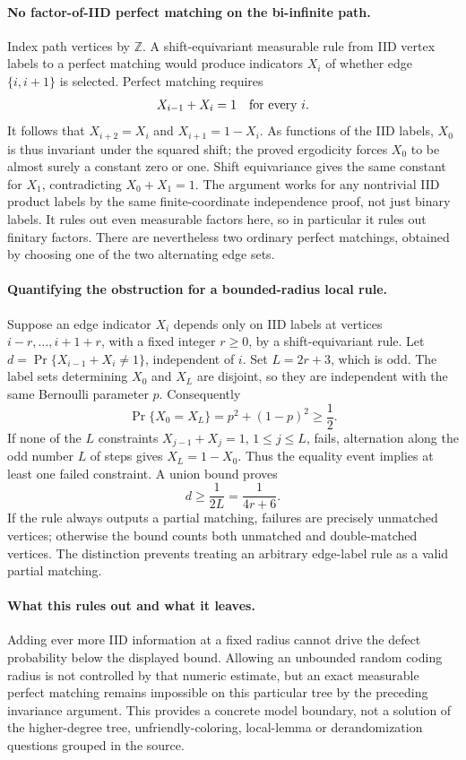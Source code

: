 \documentclass[11pt]{article}
\begin{document}
\paragraph{No factor-of-IID perfect matching on the bi-infinite path.}
Index path vertices by $\mathbb Z$. A shift-equivariant measurable rule from
IID vertex labels to a perfect matching would produce indicators $X_i$ of
whether edge $\{i,i+1\}$ is selected. Perfect matching requires
\[
 X_{i-1}+X_i=1\quad\hbox{for every }i.
\]
It follows that $X_{i+2}=X_i$ and $X_{i+1}=1-X_i$.
As functions of the IID labels, $X_0$ is thus invariant under the squared
shift; the proved ergodicity forces $X_0$ to be almost surely a constant zero
or one. Shift equivariance gives the same constant for $X_1$, contradicting
$X_0+X_1=1$. The argument works for any nontrivial IID product labels by the
same finite-coordinate independence proof, not just binary labels.
It rules out even measurable factors here, so in particular it rules out
finitary factors. There are nevertheless two ordinary perfect matchings,
obtained by choosing one of the two alternating edge sets.

\paragraph{Quantifying the obstruction for a bounded-radius local rule.}
Suppose an edge indicator $X_i$ depends only on IID labels at vertices
$i-r,\ldots,i+1+r$, with a fixed integer $r\geq0$, by a shift-equivariant
rule. Let
$d=\Pr\{X_{i-1}+X_i\ne1\}$, independent of $i$.
Set $L=2r+3$, which is odd. The label sets determining $X_0$ and $X_L$
are disjoint, so they are independent with the same Bernoulli parameter $p$.
Consequently
\[
 \Pr\{X_0=X_L\}=p^2+(1-p)^2\geq\frac12.
\]
If none of the $L$ constraints $X_{j-1}+X_j=1$, $1\leq j\leq L$,
fails, alternation along the odd number $L$ of steps gives $X_L=1-X_0$.
Thus the equality event implies at least one failed constraint. A union bound
proves
\[
 d\geq\frac1{2L}=\frac1{4r+6}.
\]
If the rule always outputs a partial matching, failures are precisely unmatched
vertices; otherwise the bound counts both unmatched and double-matched
vertices. The distinction prevents treating an arbitrary edge-label rule as a
valid partial matching.

\paragraph{What this rules out and what it leaves.}
Adding ever more IID information at a fixed radius cannot drive the defect
probability below the displayed bound. Allowing an unbounded random coding
radius is not controlled by that numeric estimate, but an exact measurable
perfect matching remains impossible on this particular tree by the preceding
invariance argument. This provides a concrete model boundary, not a solution
of the higher-degree tree, unfriendly-coloring, local-lemma or derandomization
questions grouped in the source.
\end{document}
